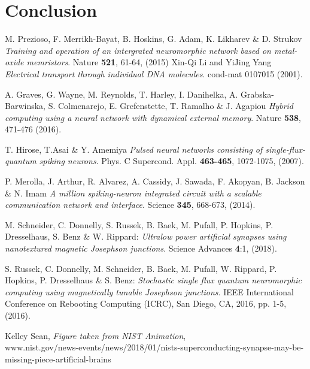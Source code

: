 \documentclass[12pt]{article}
\begin{document}
\newpage
\section{Conclusion}
\newpage
\begin{thebibliography}{10}

 M. Prezioso, F. Merrikh-Bayat, B. Hoskins, G. Adam, K. Likharev \& D. Strukov \textit{Training and operation of an intergrated neuromorphic network based on metal-oxide memristors}. Nature \textbf{521}, 61-64, (2015)
 Xin-Qi Li and YiJing Yang \textit{Electrical transport through individual DNA molecules}. cond-mat 0107015 (2001).

 A. Graves, G. Wayne, M. Reynolds, T. Harley, I. Danihelka, A. Grabska-Barwinska, S. Colmenarejo, E. Grefenstette, T. Ramalho \& J. Agapiou \textit{Hybrid computing using a neural network with dynamical external memory}. Nature \textbf{538}, 471-476 (2016).

 T. Hirose, T.Asai \& Y. Amemiya \textit{Pulsed neural networks consisting of single-flux-quantum spiking neurons}. Phys. C Supercond. Appl. \textbf{463-465}, 1072-1075, (2007).

 P. Merolla, J. Arthur, R. Alvarez, A. Cassidy, J. Sawada, F. Akopyan, B. Jackson \& N. Imam \textit{A million spiking-neuron integrated circuit with a scalable communication network and interface}. Science \textbf{345}, 668-673, (2014).

 M. Schneider, C. Donnelly, S. Russek, B. Baek, M. Pufall, P. Hopkins, P. Dresselhaus, S. Benz \& W. Rippard:  \textit{Ultralow power artificial synapses using nanotextured magnetic Josephson junctions}. Science Advances \textbf{4}:1, (2018).

 S. Russek, C. Donnelly, M. Schneider, B. Baek, M. Pufall, W. Rippard,
P. Hopkins, P. Dresselhaus \& S. Benz: \textit{Stochastic single flux quantum neuromorphic computing using magnetically tunable Josephson junctions}. IEEE International Conference on Rebooting Computing (ICRC), San Diego, CA, 2016, pp. 1-5, (2016).

 Kelley Sean, \textit{Figure taken from NIST Animation}, 
\\ www.nist.gov/news-events/news/2018/01/nists-superconducting-synapse-may-be-missing-piece-artificial-brains
\end{thebibliography}
\end{document}
